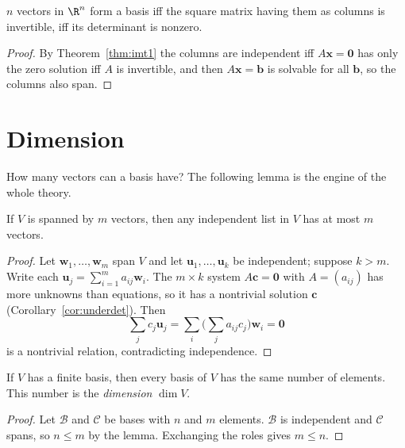 \begin{theorem}[Bases of $\R^n$]\label{thm:basisRn}
$n$ vectors in $\R^n$ form a basis iff the square matrix having them as columns is invertible, iff its determinant is nonzero.
\end{theorem}

\begin{proof}
By Theorem~\ref{thm:imt1} the columns are independent iff $A\mathbf{x}=\mathbf{0}$ has only the zero solution iff $A$ is invertible, and then $A\mathbf{x}=\mathbf{b}$ is solvable for all $\mathbf{b}$, so the columns also span.
\end{proof}

\section{Dimension}

How many vectors can a basis have? The following lemma is the engine of the whole theory.

\begin{lemma}\label{lem:exchange}
If $V$ is spanned by $m$ vectors, then any independent list in $V$ has at most $m$ vectors.
\end{lemma}

\begin{proof}
Let $\mathbf{w}_1,\dots,\mathbf{w}_m$ span $V$ and let $\mathbf{u}_1,\dots,\mathbf{u}_k$ be independent; suppose $k>m$. Write each $\mathbf{u}_j=\sum_{i=1}^ma_{ij}\mathbf{w}_i$. The $m\times k$ system $A\mathbf{c}=\mathbf{0}$ with $A=(a_{ij})$ has more unknowns than equations, so it has a nontrivial solution $\mathbf{c}$ (Corollary~\ref{cor:underdet}). Then
\[ \sum_jc_j\mathbf{u}_j=\sum_i\Big(\sum_ja_{ij}c_j\Big)\mathbf{w}_i=\mathbf{0} \]
is a nontrivial relation, contradicting independence.
\end{proof}

\begin{theorem}\label{thm:dim}
If $V$ has a finite basis, then every basis of $V$ has the same number of elements. This number is the \emph{dimension} $\dim V$.
\end{theorem}

\begin{proof}
Let $\mathcal{B}$ and $\mathcal{C}$ be bases with $n$ and $m$ elements. $\mathcal{B}$ is independent and $\mathcal{C}$ spans, so $n\le m$ by the lemma. Exchanging the roles gives $m\le n$.
\end{proof}

